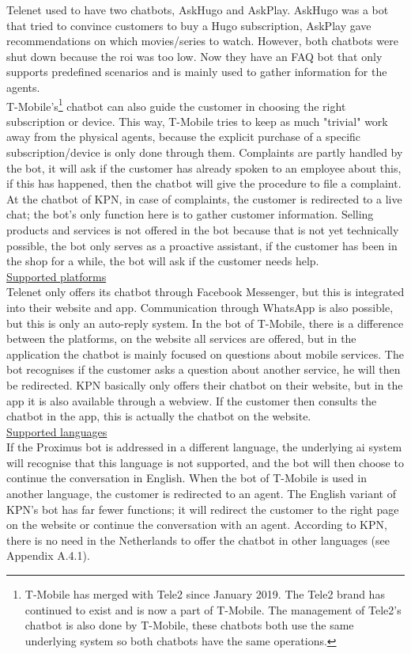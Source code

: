 \break
Telenet used to have two chatbots, AskHugo and AskPlay. AskHugo was a bot that tried to convince customers to buy a Hugo subscription, AskPlay gave recommendations on which movies/series to watch. However, both chatbots were shut down because the \acrshort{roi} was too low. Now they have an FAQ bot that only supports predefined scenarios and is mainly used to gather information for the agents.\\
\break
T-Mobile's\footnote{T-Mobile has merged with Tele2 since January 2019. The Tele2 brand has continued to exist and is now a part of T-Mobile. The management of Tele2's chatbot is also done by T-Mobile, these chatbots both use the same underlying system so both chatbots have the same operations.} chatbot can also guide the customer in choosing the right subscription or device. This way, T-Mobile tries to keep as much "trivial" work away from the physical agents, because the explicit purchase of a specific subscription/device is only done through them. Complaints are partly handled by the bot, it will ask if the customer has already spoken to an employee about this, if this has happened, then the chatbot will give the procedure to file a complaint.\\
\break
At the chatbot of KPN, in case of complaints, the customer is redirected to a live chat; the bot's only function here is to gather customer information. Selling products and services is not offered in the bot because that is not yet technically possible, the bot only serves as a proactive assistant, if the customer has been in the shop for a while, the bot will ask if the customer needs help.\\
\break
\ul{Supported platforms}\\
Telenet only offers its chatbot through Facebook Messenger, but this is integrated into their website and app. Communication through WhatsApp is also possible, but this is only an auto-reply system. In the bot of T-Mobile, there is a difference between the platforms, on the website all services are offered, but in the application the chatbot is mainly focused on questions about mobile services. The bot recognises if the customer asks a question about another service, he will then be redirected. KPN basically only offers their chatbot on their website, but in the app it is also available through a webview. If the customer then consults the chatbot in the app, this is actually the chatbot on the website.\\
\break
\ul{Supported languages}\\
If the Proximus bot is addressed in a different language, the underlying \acrshort{ai} system will recognise that this language is not supported, and the bot will then choose to continue the conversation in English. When the bot of T-Mobile is used in another language, the customer is redirected to an agent. The English variant of KPN's bot has far fewer functions; it will redirect the customer to the right page on the website or continue the conversation with an agent. According to KPN, there is no need in the Netherlands to offer the chatbot in other languages (see Appendix A.4.1). \\
